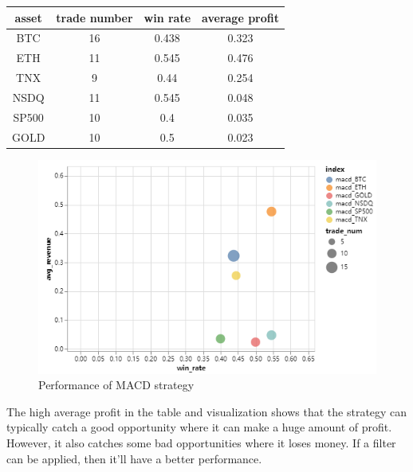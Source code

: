 \documentclass[a4paper]{article}
\begin{document}
\begin{table}[H]
    \centering
    \begin{tabular}{@{}|c|c|c|c|@{}}
    \hline
    asset   & trade number & win rate & average profit \\ \hline
    BTC & 16   & 0.438          & 0.323 \\ \hline
    ETH & 11   & 0.545         & 0.476  \\ \hline
    TNX & 9   & 0.44          & 0.254 \\ \hline
    NSDQ & 11   & 0.545        & 0.048  \\ \hline
    SP500 & 10   & 0.4        & 0.035 \\ \hline
    GOLD & 10   & 0.5         & 0.023 \\ \hline
    \end{tabular}
\end{table}
\begin{figure}[H]
    \centering
    \includegraphics[scale=0.5]{Q4.png}
    \caption{Performance of MACD strategy}
\end{figure}
The high average profit in the table and visualization shows that the strategy can typically catch a good opportunity where it can make a huge amount of profit. However, it also catches some bad opportunities where it loses money. If a filter can be applied, then it'll have a better performance.
\end{document}
